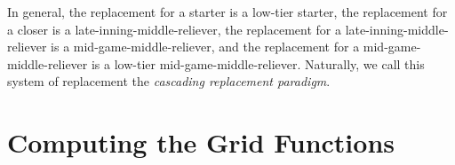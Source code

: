 \documentclass[12pt]{article}
\begin{document}
In general, the replacement for a starter is a low-tier starter, the replacement for a closer is a late-inning-middle-reliever, the replacement for a late-inning-middle-reliever is a mid-game-middle-reliever, and the replacement for a mid-game-middle-reliever is a low-tier mid-game-middle-reliever. Naturally, we call this system of replacement the \textit{cascading replacement paradigm}. 








\section{Computing the Grid Functions}
\end{document}
